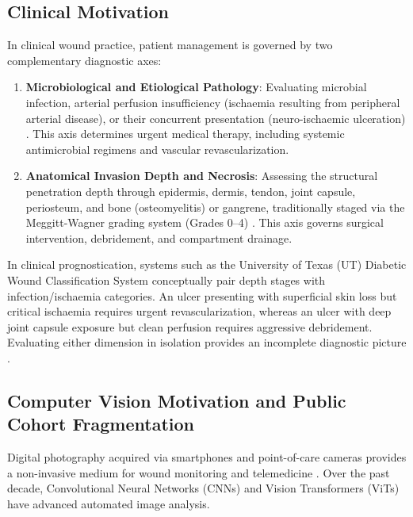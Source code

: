 \documentclass[journal]{IEEEtran}
\begin{document}
\subsection{Clinical Motivation}
In clinical wound practice, patient management is governed by two complementary diagnostic axes:
\begin{enumerate}
    \item \textbf{Microbiological and Etiological Pathology}: Evaluating microbial infection, arterial perfusion insufficiency (ischaemia resulting from peripheral arterial disease), or their concurrent presentation (neuro-ischaemic ulceration) \cite{goyal2020recognition, armstrong1998validation}. This axis determines urgent medical therapy, including systemic antimicrobial regimens and vascular revascularization.
    \item \textbf{Anatomical Invasion Depth and Necrosis}: Assessing the structural penetration depth through epidermis, dermis, tendon, joint capsule, periosteum, and bone (osteomyelitis) or gangrene, traditionally staged via the Meggitt-Wagner grading system (Grades 0--4) \cite{wagner1981dysvascular}. This axis governs surgical intervention, debridement, and compartment drainage.
\end{enumerate}

In clinical prognostication, systems such as the University of Texas (UT) Diabetic Wound Classification System \cite{armstrong1998validation} conceptually pair depth stages with infection/ischaemia categories. An ulcer presenting with superficial skin loss but critical ischaemia requires urgent revascularization, whereas an ulcer with deep joint capsule exposure but clean perfusion requires aggressive debridement. Evaluating either dimension in isolation provides an incomplete diagnostic picture \cite{armstrong1998validation}.

\subsection{Computer Vision Motivation and Public Cohort Fragmentation}
Digital photography acquired via smartphones and point-of-care cameras provides a non-invasive medium for wound monitoring and telemedicine \cite{goyal2019robust, yap2022development}. Over the past decade, Convolutional Neural Networks (CNNs) \cite{goyal2020dfunet, goyal2019robust, goyal2020recognition} and Vision Transformers (ViTs) \cite{galdran2021convolutional, karthik2025attention} have advanced automated image analysis.
\end{document}
